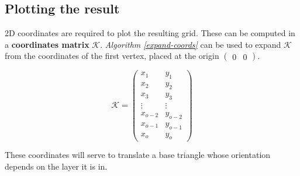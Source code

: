 \documentclass{article}
\begin{document}
\pagebreak
\subsection{Plotting the result}
2D coordinates are required to plot the resulting grid. These can be computed in a \textbf{coordinates matrix} $\mathcal{K}$. \textit{Algorithm \ref{expand-coords}} can be used to expand $\mathcal{K}$ from the coordinates of the first vertex, placed at the origin $\begin{pmatrix}0&0\end{pmatrix}$.

\begin{equation}
\mathcal{K}=
\begin{pmatrix}
x_1 & y_1 \\
x_2 & y_2 \\
x_3 & y_3 \\
\vdots & \vdots \\
x_{o-2} & y_{o-2} \\
x_{o-1} & y_{o-1} \\
x_o & y_o 
\end{pmatrix}
\end{equation}

\medskip

These coordinates will serve to translate a base triangle whose orientation depends on the layer it is in. 
\end{document}
